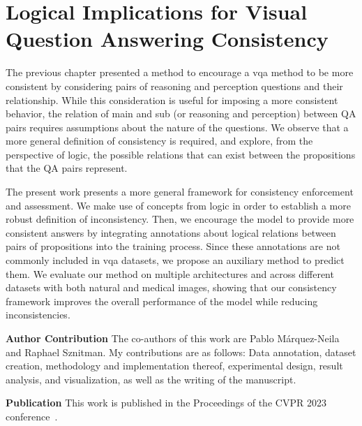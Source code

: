 \chapter{Logical Implications for Visual Question Answering Consistency}
\label{chapter:cons_logic}

The previous chapter presented a method to encourage a \gls{vqa} method to be more consistent by considering pairs of reasoning and perception questions and their relationship. While this consideration is useful for imposing a more consistent behavior, the relation of main and sub (or reasoning and perception) between QA pairs requires assumptions about the nature of the questions. We observe that a more general definition of consistency is required, and explore, from the perspective of logic, the possible relations that can exist between the propositions that the QA pairs represent. 

The present work presents a more general framework for consistency enforcement and assessment. We make use of concepts from logic in order to establish a more robust definition of inconsistency. Then, we encourage the model to provide more consistent answers by integrating annotations about logical relations between pairs of propositions into the training process. Since these annotations are not commonly included in \gls{vqa} datasets, we propose an auxiliary method to predict them. We evaluate our method on multiple architectures and across different datasets with both natural and medical images, showing that our consistency framework improves the overall performance of the model while reducing inconsistencies.

\textbf{Author Contribution} The co-authors of this work are Pablo Márquez-Neila and Raphael Sznitman. My contributions are as follows: Data annotation, dataset creation, methodology and implementation thereof, experimental design, result analysis, and visualization, as well as the writing of the manuscript.

\textbf{Publication} This work is published in the Proceedings of the CVPR 2023 conference~\cite{tascon2023logical}.

\newpage




